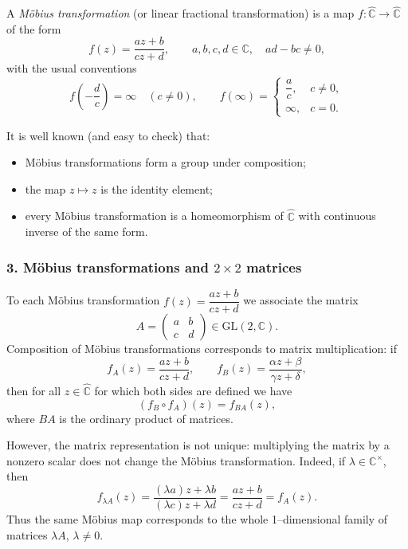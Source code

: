 \documentclass[12pt,a4paper]{article}
\theoremstyle{plain}
\theoremstyle{definition}      %
\begin{document}
	A \emph{Möbius transformation} (or linear fractional transformation) is a
	map $f:\widehat{\mathbb{C}}\to\widehat{\mathbb{C}}$ of the form
	\[
	f(z) = \frac{az+b}{cz+d},
	\qquad a,b,c,d\in\mathbb{C},\quad ad-bc\neq 0,
	\]
	with the usual conventions
	\[
	f\!\left(-\frac{d}{c}\right) = \infty\quad (c\neq 0),\qquad
	f(\infty) =
	\begin{cases}
		\dfrac{a}{c}, & c\neq 0,\\[0.4em]
		\infty, & c=0.
	\end{cases}
	\]
	
	It is well known (and easy to check) that:
	
	\begin{itemize}
		\item Möbius transformations form a group under composition;
		\item the map $z\mapsto z$ is the identity element;
		\item every Möbius transformation is a homeomorphism of
		$\widehat{\mathbb{C}}$ with continuous inverse of the same form.
	\end{itemize}
	
	\subsubsection*{3. Möbius transformations and $2\times 2$ matrices}
	
	To each Möbius transformation $f(z)=\dfrac{az+b}{cz+d}$ we associate the
	matrix
	\[
	A =
	\begin{pmatrix}
		a & b\\
		c & d
	\end{pmatrix}
	\in \mathrm{GL}(2,\mathbb{C}).
	\]
	Composition of Möbius transformations corresponds to matrix multiplication:
	if
	\[
	f_A(z) = \frac{az+b}{cz+d},\qquad
	f_B(z) = \frac{\alpha z+\beta}{\gamma z+\delta},
	\]
	then for all $z\in\widehat{\mathbb{C}}$ for which both sides are defined we
	have
	\[
	(f_B\circ f_A)(z) = f_{BA}(z),
	\]
	where $BA$ is the ordinary product of matrices.
	
	However, the matrix representation is not unique: multiplying the matrix by
	a nonzero scalar does not change the Möbius transformation.  Indeed, if
	$\lambda\in\mathbb{C}^{\times}$, then
	\[
	f_{\lambda A}(z)
	= \frac{(\lambda a)z + \lambda b}{(\lambda c)z + \lambda d}
	= \frac{az+b}{cz+d}
	= f_{A}(z).
	\]
	Thus the same Möbius map corresponds to the whole 1--dimensional family of
	matrices $\lambda A$, $\lambda\neq 0$.
	
\end{document}
